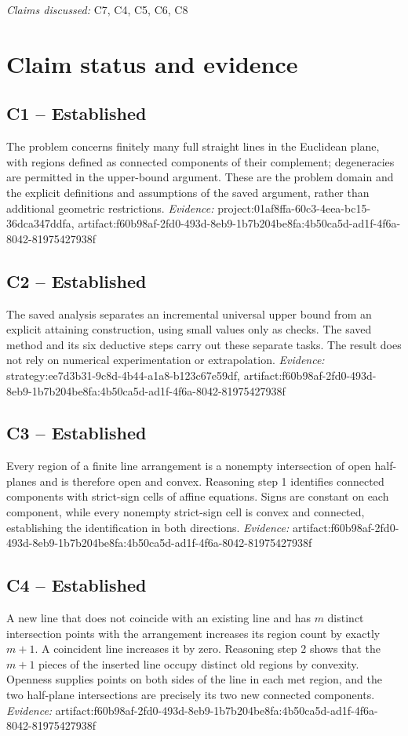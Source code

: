 \documentclass[11pt]{article}
\begin{document}
\textit{Claims discussed: }C7, C4, C5, C6, C8
\section*{Claim status and evidence}
\subsection{C1 -- Established}
The problem concerns finitely many full straight lines in the Euclidean plane, with regions defined as connected components of their complement; degeneracies are permitted in the upper-bound argument.
These are the problem domain and the explicit definitions and assumptions of the saved argument, rather than additional geometric restrictions.
\textit{Evidence: }project:01af8ffa-60c3-4eea-bc15-36dca347ddfa, artifact:f60b98af-2fd0-493d-8eb9-1b7b204be8fa:4b50ca5d-ad1f-4f6a-8042-81975427938f
\subsection{C2 -- Established}
The saved analysis separates an incremental universal upper bound from an explicit attaining construction, using small values only as checks.
The saved method and its six deductive steps carry out these separate tasks. The result does not rely on numerical experimentation or extrapolation.
\textit{Evidence: }strategy:ee7d3b31-9c8d-4b44-a1a8-b123c67e59df, artifact:f60b98af-2fd0-493d-8eb9-1b7b204be8fa:4b50ca5d-ad1f-4f6a-8042-81975427938f
\subsection{C3 -- Established}
Every region of a finite line arrangement is a nonempty intersection of open half-planes and is therefore open and convex.
Reasoning step 1 identifies connected components with strict-sign cells of affine equations. Signs are constant on each component, while every nonempty strict-sign cell is convex and connected, establishing the identification in both directions.
\textit{Evidence: }artifact:f60b98af-2fd0-493d-8eb9-1b7b204be8fa:4b50ca5d-ad1f-4f6a-8042-81975427938f
\subsection{C4 -- Established}
A new line that does not coincide with an existing line and has $m$ distinct intersection points with the arrangement increases its region count by exactly $m+1$. A coincident line increases it by zero.
Reasoning step 2 shows that the $m+1$ pieces of the inserted line occupy distinct old regions by convexity. Openness supplies points on both sides of the line in each met region, and the two half-plane intersections are precisely its two new connected components.
\textit{Evidence: }artifact:f60b98af-2fd0-493d-8eb9-1b7b204be8fa:4b50ca5d-ad1f-4f6a-8042-81975427938f
\end{document}
